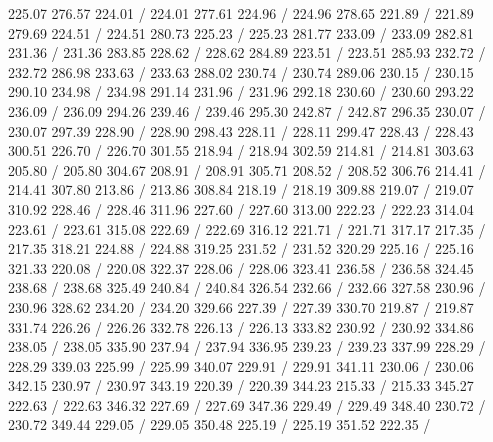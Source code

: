 { 225.07 276.57 224.01 /
 224.01 277.61 224.96 /
 224.96 278.65 221.89 /
 221.89 279.69 224.51 /
 224.51 280.73 225.23 /
 225.23 281.77 233.09 /
 233.09 282.81 231.36 /
 231.36 283.85 228.62 /
 228.62 284.89 223.51 /
 223.51 285.93 232.72 /
 232.72 286.98 233.63 /
 233.63 288.02 230.74 /
 230.74 289.06 230.15 /
 230.15 290.10 234.98 /
 234.98 291.14 231.96 /
 231.96 292.18 230.60 /
 230.60 293.22 236.09 /
 236.09 294.26 239.46 /
 239.46 295.30 242.87 /
 242.87 296.35 230.07 /
 230.07 297.39 228.90 /
 228.90 298.43 228.11 /
 228.11 299.47 228.43 /
 228.43 300.51 226.70 /
 226.70 301.55 218.94 /
 218.94 302.59 214.81 /
 214.81 303.63 205.80 /
 205.80 304.67 208.91 /
 208.91 305.71 208.52 /
 208.52 306.76 214.41 /
 214.41 307.80 213.86 /
 213.86 308.84 218.19 /
 218.19 309.88 219.07 /
 219.07 310.92 228.46 /
 228.46 311.96 227.60 /
 227.60 313.00 222.23 /
 222.23 314.04 223.61 /
 223.61 315.08 222.69 /
 222.69 316.12 221.71 /
 221.71 317.17 217.35 /
 217.35 318.21 224.88 /
 224.88 319.25 231.52 /
 231.52 320.29 225.16 /
 225.16 321.33 220.08 /
 220.08 322.37 228.06 /
 228.06 323.41 236.58 /
 236.58 324.45 238.68 /
 238.68 325.49 240.84 /
 240.84 326.54 232.66 /
 232.66 327.58 230.96 /
 230.96 328.62 234.20 /
 234.20 329.66 227.39 /
 227.39 330.70 219.87 /
 219.87 331.74 226.26 /
 226.26 332.78 226.13 /
 226.13 333.82 230.92 /
 230.92 334.86 238.05 /
 238.05 335.90 237.94 /
 237.94 336.95 239.23 /
 239.23 337.99 228.29 /
 228.29 339.03 225.99 /
 225.99 340.07 229.91 /
 229.91 341.11 230.06 /
 230.06 342.15 230.97 /
 230.97 343.19 220.39 /
 220.39 344.23 215.33 /
 215.33 345.27 222.63 /
 222.63 346.32 227.69 /
 227.69 347.36 229.49 /
 229.49 348.40 230.72 /
 230.72 349.44 229.05 /
 229.05 350.48 225.19 /
 225.19 351.52 222.35 /
}
